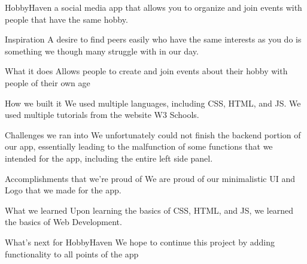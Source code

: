 HobbyHaven
a social media app that allows you to organize and join events with people that have the same hobby.

Inspiration
A desire to find peers easily who have the same interests as you do is something we though many struggle with in our day.

What it does
Allows people to create and join events about their hobby with people of their own age

How we built it
We used multiple languages, including CSS, HTML, and JS. We used multiple tutorials from the website W3 Schools.

Challenges we ran into
We unfortunately could not finish the backend portion of our app, essentially leading to the malfunction of some functions that we intended for the app, including the entire left side panel.

Accomplishments that we're proud of
We are proud of our minimalistic UI and Logo that we made for the app.

What we learned
Upon learning the basics of CSS, HTML, and JS, we learned the basics of Web Development.

What's next for HobbyHaven
We hope to continue this project by adding functionality to all points of the app
